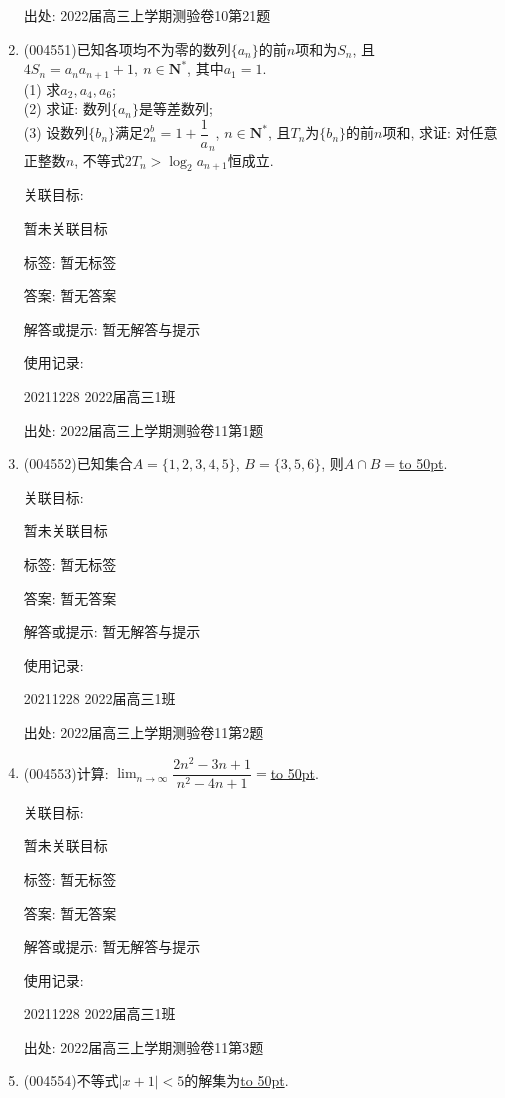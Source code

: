 \documentclass[10pt,a4paper]{article}
\newcommand{\blank}[1]{\underline{\hbox to #1pt{}}}
\begin{document}
\begin{enumerate}[1.]
出处: 2022届高三上学期测验卷10第21题
\item { (004551)}已知各项均不为零的数列$\{a_n\}$的前$n$项和为$S_n$, 且$4S_n=a_na_{n+1}+1, \ n\in \mathbf{N}^*$, 其中$a_1=1$.\\
(1) 求$a_2,a_4,a_6$;\\
(2) 求证: 数列$\{a_n\}$是等差数列;\\
(3) 设数列$\{b_n\}$满足$2^b_n=1+\dfrac 1a_n$, $n\in \mathbf{N}^*$, 且$T_n$为$\{b_n\}$的前$n$项和, 求证: 对任意正整数$n$, 不等式$2T_n>\log_2 a_{n+1}$恒成立.


关联目标:

暂未关联目标



标签: 暂无标签

答案: 暂无答案

解答或提示: 暂无解答与提示

使用记录:

20211228	2022届高三1班	


出处: 2022届高三上学期测验卷11第1题
\item { (004552)}已知集合$A=\{1,2,3,4,5\}$, $B=\{3,5,6\}$, 则$A\cap B=$\blank{50}.


关联目标:

暂未关联目标



标签: 暂无标签

答案: 暂无答案

解答或提示: 暂无解答与提示

使用记录:

20211228	2022届高三1班	


出处: 2022届高三上学期测验卷11第2题
\item { (004553)}计算: $\displaystyle\lim_{n\to\infty}\dfrac{2n^2-3n+1}{n^2-4n+1}=$\blank{50}.


关联目标:

暂未关联目标



标签: 暂无标签

答案: 暂无答案

解答或提示: 暂无解答与提示

使用记录:

20211228	2022届高三1班	


出处: 2022届高三上学期测验卷11第3题
\item { (004554)}不等式$|x+1|<5$的解集为\blank{50}.



\end{enumerate}
\end{document}
